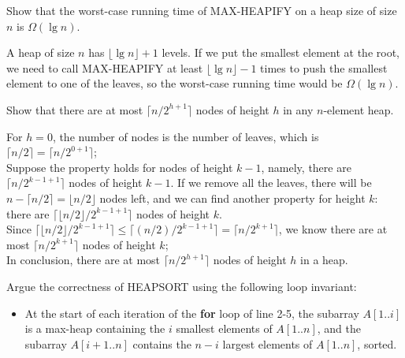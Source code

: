 \documentclass[12pt, a4paper, UTF8]{ctexart}
\begin{document}
\begin{problem}[TC: 6.2-6]
  Show that the worst-case running time of MAX-HEAPIFY on a heap size 
  of size $n$ is $\Omega(\lg n)$.
\end{problem}

\begin{solution}
  A heap of size $n$ has $\lfloor\lg n\rfloor + 1$ levels. If we put 
  the smallest element at the root, we need to call MAX-HEAPIFY at 
  least $\lfloor\lg n\rfloor - 1$ times to push the smallest element 
  to one of the leaves, so the worst-case running time would be $\Omega(\lg n)$.
\end{solution}

\begin{problem}[TC: 6.3-3]
  Show that there are at most $\lceil n/2^{h+1}\rceil$ nodes of height 
  $h$ in any $n$-element heap.
\end{problem}

\begin{solution}
  For $h = 0$, the number of nodes is the number of leaves, which is 
  $\lceil n/2\rceil = \lceil n/2^{0 + 1}\rceil$;\\
  Suppose the property holds for nodes of height $k-1$, namely, there 
  are $\lceil n/2^{k-1+1}\rceil$ nodes of height $k - 1$. If we remove 
  all the leaves, there will be $n-\lceil n/2\rceil = \lfloor n/2\rfloor$ 
  nodes left, and we can find another property for height $k$: there 
  are $\lceil\lfloor n/2\rfloor/2^{k-1+1}\rceil$ nodes of height $k$.\\
  Since $\lceil\lfloor n/2\rfloor/2^{k-1+1}\rceil \leq \lceil(n/2)/2^{k-1+1}\rceil 
  = \lceil n/2^{k+1}\rceil$, we know there are at most $\lceil n/2^{k+1}\rceil$ 
  nodes of height $k$;\\
  In conclusion, there are at most $\lceil n/2^{h+1}\rceil$ nodes of 
  height $h$ in a heap.
\end{solution}

\begin{problem}[TC: 6.4-2]
  Argue the correctness of HEAPSORT using the following loop invariant:
  \begin{itemize}
    \item [] At the start of each iteration of the \textbf{for} loop of 
    line 2-5, the subarray $A[1..i]$ is a max-heap containing the $i$ 
    smallest elements of $A[1..n]$, and the subarray $A[i+1..n]$ 
    contains the $n-i$ largest elements of $A[1..n]$, sorted.
  \end{itemize}
\end{problem}
\end{document}
